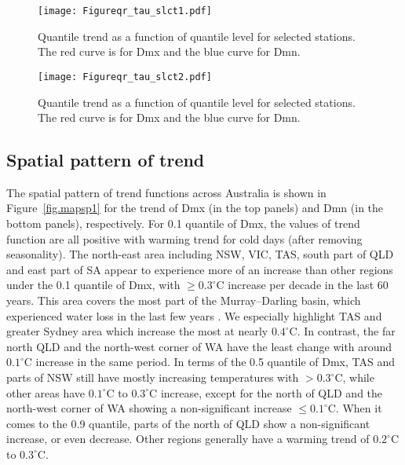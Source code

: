 \documentclass[fleqn,10pt]{wlscirep}
\newcommand{\dc}[1]{#1^{ \circ}\mathrm{C}}
\begin{document}
\begin{figure}[H]
	\texttt{[image: Figureqr\_tau\_slct1.pdf]}
	\caption{Quantile trend as a function of quantile level for selected stations. The red curve is for Dmx and the blue curve for Dmn. }
	
	\label{fig.qt.mxmn1}
\end{figure}
\begin{figure}[H]
	\texttt{[image: Figureqr\_tau\_slct2.pdf]}
	\caption{Quantile trend as a function of quantile level for selected stations. The red curve is for Dmx and the blue curve for Dmn. }
	
	\label{fig.qt.mxmn2}
\end{figure}

\subsection*{Spatial pattern of trend}


The spatial pattern of trend functions across Australia is shown in Figure~\ref{fig.mapsp1} for the trend of Dmx (in the top panels) and Dmn (in the bottom panels), respectively. For 0.1 quantile of Dmx, the values of trend function are all positive with warming trend for cold days (after removing seasonality). The north-east area including NSW, VIC, TAS, south part of QLD and east part of SA appear to experience more of an increase than other regions under the 0.1 quantile of Dmx, with $\geq \dc{0.3}$ increase per decade in the last 60 years. This area covers the most part of the Murray–Darling basin, which experienced water loss in the last few years \cite{MDwaterloss}. We especially highlight TAS and greater Sydney area which increase the most at nearly $\dc{0.4}$.  In contrast, the far north QLD and the north-west corner of WA have the least change with around $\dc{0.1}$ increase in the same period.
In terms of the 0.5 quantile of Dmx, TAS and parts of NSW still have mostly increasing temperatures with  $>\dc{0.3}$, while other areas have $\dc{0.1}$ to $\dc{0.3}$ increase, except for the north of QLD and the north-west corner of WA showing a non-significant increase $\leq\dc{0.1}$. When it comes to the 0.9 quantile, parts of the north of QLD show a non-significant increase, or even decrease. Other regions generally have a warming trend of $\dc{0.2}$ to $\dc{0.3}$.

\bigskip
\end{document}
